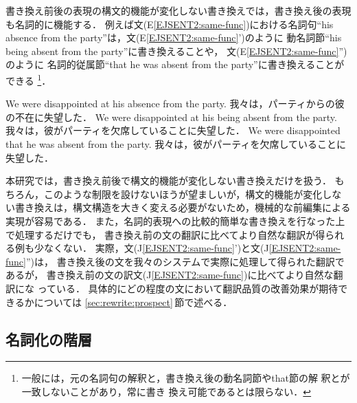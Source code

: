 書き換え前後の表現の構文的機能が変化しない書き換えでは，書き換え後の表現
も名詞的に機能する．
例えば文(E\ref{EJSENT2:same-func})における名詞句``his absence from the 
party''は，文(E\ref{EJSENT2:same-func}')のように
動名詞節``his being absent from the party''に書き換えることや，
文(E\ref{EJSENT2:same-func}'')のように
名詞的従属節``that he was absent from the party''に書き換えることができる
\footnote{一般には，元の名詞句の解釈と，書き換え後の動名詞節やthat節の解
釈とが一致しないことがあり\cite{Chomsky70,Thomason85,Siegel97}，常に書き
換え可能であるとは限らない．}．
\begin{EJSENT2}
\sentE We were disappointed at his absence from the party.
\sentJ 我々は，パーティからの彼の不在に失望した．
\sentRewE We were disappointed at his being absent from the party.
\sentRewJ 我々は，彼がパーティを欠席していることに失望した．
\sentYAE We were disappointed that he was absent from the party.
\sentYAJ 我々は，彼がパーティを欠席していることに失望した．
\label{EJSENT2:same-func}
\end{EJSENT2}

本研究では，書き換え前後で構文的機能が変化しない書き換えだけを扱う．
もちろん，このような制限を設けないほうが望ましいが，構文的機能が変化しな
い書き換えは，構文構造を大きく変える必要がないため，機械的な前編集による
実現が容易である．
また，名詞的表現への比較的簡単な書き換えを行なった上で処理するだけでも，
書き換え前の文の翻訳に比べてより自然な翻訳が得られる例も少なくない．
実際，文(J\ref{EJSENT2:same-func}')と文(J\ref{EJSENT2:same-func}'')は，
書き換え後の文を我々のシステムで実際に処理して得られた翻訳であるが，
書き換え前の文の訳文(J\ref{EJSENT2:same-func})に比べてより自然な翻訳にな
っている．
具体的にどの程度の文において翻訳品質の改善効果が期待できるかについては
\ref{sec:rewrite:prospect}\,節で述べる．

\subsection{名詞化の階層}
\label{sec:classify:depred}

